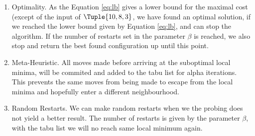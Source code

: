 \begin{enumerate}
\item Optimality. As the Equation \ref{eq:lb} gives a lower bound for the maximal cost (except of the input of $\Tuple{10, 8, 3}$, we have found an optimal solution, if we reached the lower bound given by Equation \ref{eq:lb}, and can stop the algorithm. If the number of restarts set in the parameter $\beta$ is reached, we also stop and return the best found configuration up until this point. 
\item Meta-Heuristic. All moves made before arriving at the suboptimal local minima, will be commited and added to the tabu list for alpha iterations. This prevents the same moves from being made to escape from the local minima and hopefully enter a different neighbourhood.
  
\item Random Restarts. We can make random restarts when we the probing does not yield a better result. The number of restarts is given by the parameter $\beta$, with the tabu list we will no reach same local minimum again. 
\end{enumerate}

